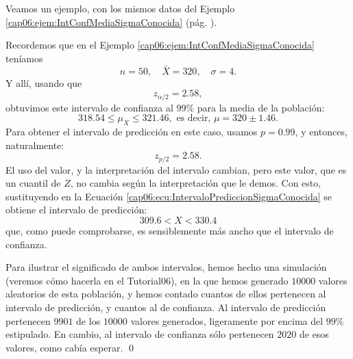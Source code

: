 Veamos un ejemplo, con los mismos datos del Ejemplo \ref{cap06:ejem:IntConfMediaSigmaConocida} (pág. \pageref{cap06:ejem:IntConfMediaSigmaConocida}).
\begin{ejemplo}
\label{cap06:ejem:IntPrediccionSigmaConocida}
   Recordemos que en el Ejemplo \ref{cap06:ejem:IntConfMediaSigmaConocida} teníamos
   \[n=50, \quad \bar X=320,\quad \sigma=4.\]
   Y allí, usando que
   \[z_{\alpha/2}=2.58,\]
   obtuvimos este intervalo de confianza al $99\%$ para la media de la población:
   \[318.54\leq \mu_X\leq 321.46,\mbox{ es decir, }\mu=320\pm 1.46.\]
   Para obtener el intervalo de predicción en este caso, usamos $p=0.99$, y entonces, naturalmente:
   \[z_{p/2}=2.58.\]
   El uso del valor, y la interpretación del intervalo cambian, pero este valor, que es un cuantil de $Z$, no cambia según la interpretación que le demos. Con esto, sustituyendo en la Ecuación \ref{cap06:ecu:IntervaloPrediccionSigmaConocida} se obtiene el intervalo de predicción:
   \[ 309.6 < X < 330.4 \]
   que, como puede comprobarse, es sensiblemente más ancho que el intervalo de confianza.

   Para ilustrar el significado de ambos intervalos, hemos hecho una simulación (veremos cómo hacerla en el Tutorial06), en la que hemos generado $10000$ valores aleatorios de esta población, y hemos contado cuantos de ellos pertenecen al intervalo de predicción, y cuantos al de confianza.  Al intervalo de predicción pertenecen $9901$ de los $10000$ valores generados, ligeramente por encima del $99\%$ estipulado. En cambio, al intervalo de confianza sólo pertenecen $2020$ de esos valores, como cabía esperar.
\qed
\end{ejemplo}

